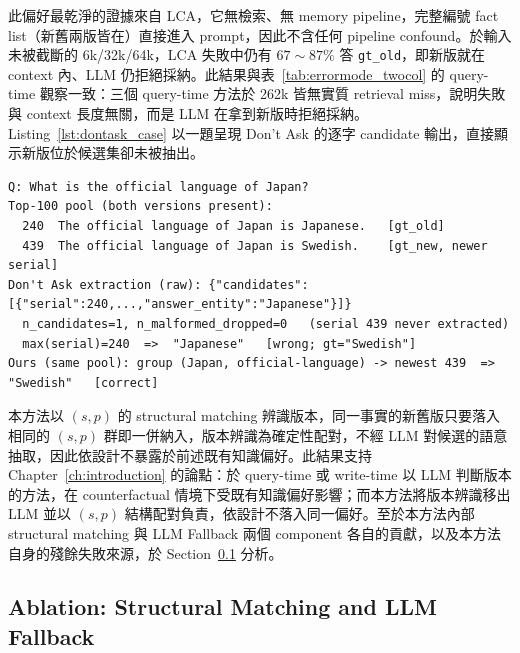 此偏好最乾淨的證據來自 LCA，它無檢索、無 memory pipeline，完整編號 fact list（新舊兩版皆在）直接進入 prompt，因此不含任何 pipeline confound。於輸入未被截斷的 6k/32k/64k，LCA 失敗中仍有 $67\sim87\%$ 答 \texttt{gt\_old}，即新版就在 context 內、LLM 仍拒絕採納。此結果與表~\ref{tab:errormode_twocol} 的 query-time 觀察一致：三個 query-time 方法於 262k 皆無實質 retrieval miss，說明失敗與 context 長度無關，而是 LLM 在拿到新版時拒絕採納。Listing~\ref{lst:dontask_case} 以一題呈現 Don't Ask 的逐字 candidate 輸出，直接顯示新版位於候選集卻未被抽出。
\begin{lstlisting}[style=tracebox, caption={一題 counterfactual 的 per-qid trace（FC-SH 6k, qid 8）。新舊版皆位於 top-100 候選集，新版序號較大；Don't Ask 的 candidate extraction 逐字輸出僅含舊版一個候選，新版是被 LLM 拒絕抽取），取序號最大者因此只能回傳舊值。本方法於同一候選集以 $(s, p)$ 歸群取最新序號，正確選出新版。}, label={lst:dontask_case}]
Q: What is the official language of Japan?
Top-100 pool (both versions present):
  240  The official language of Japan is Japanese.   [gt_old]
  439  The official language of Japan is Swedish.    [gt_new, newer serial]
Don't Ask extraction (raw): {"candidates":[{"serial":240,...,"answer_entity":"Japanese"}]}
  n_candidates=1, n_malformed_dropped=0   (serial 439 never extracted)
  max(serial)=240  =>  "Japanese"   [wrong; gt="Swedish"]
Ours (same pool): group (Japan, official-language) -> newest 439  =>  "Swedish"   [correct]
\end{lstlisting}
本方法以 $(s, p)$ 的 structural matching 辨識版本，同一事實的新舊版只要落入相同的 $(s, p)$ 群即一併納入，版本辨識為確定性配對，不經 LLM 對候選的語意抽取，因此依設計不暴露於前述既有知識偏好。此結果支持 Chapter~\ref{ch:introduction} 的論點：於 query-time 或 write-time 以 LLM 判斷版本的方法，在 counterfactual 情境下受既有知識偏好影響；而本方法將版本辨識移出 LLM 並以 $(s, p)$ 結構配對負責，依設計不落入同一偏好。至於本方法內部 structural matching 與 LLM Fallback 兩個 component 各自的貢獻，以及本方法自身的殘餘失敗來源，於 Section~\ref{subsec:fcsh_ablation} 分析。
 
\subsection{Ablation: Structural Matching and LLM Fallback}
\label{subsec:fcsh_ablation}
 
